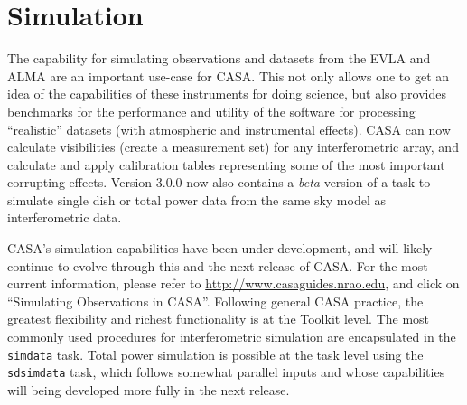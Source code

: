 

\chapter[Appendix: Simulation]{Simulation}
\label{chapter:sim}


The capability for simulating observations and datasets from the EVLA
and ALMA are an important use-case for CASA.  This not only allows one
to get an idea of the capabilities of these instruments for doing
science, but also provides benchmarks for the performance and utility
of the software for processing ``realistic'' datasets (with
atmospheric and instrumental effects).  CASA can now calculate
visibilities (create a measurement set) for any interferometric array,
and calculate and apply calibration tables representing some of the
most important corrupting effects.  Version 3.0.0 now also contains a
{\em beta} version of a task to simulate single dish or total power
data from the same sky model as interferometric data.

CASA's simulation capabilities have been under development, and will
likely continue to evolve through this and the next release of CASA.
For the most current information, please refer to
\url{http://www.casaguides.nrao.edu}, and click on ``Simulating
Observations in CASA''.
%
Following general CASA practice, the greatest flexibility and richest
functionality is at the Toolkit level.  The most commonly used
procedures for interferometric simulation are encapsulated in the {\tt
  simdata} task.  Total power simulation is possible at the task level
using the {\tt sdsimdata} task, which follows somewhat parallel inputs
and whose capabilities will being developed more fully in the next
release.


